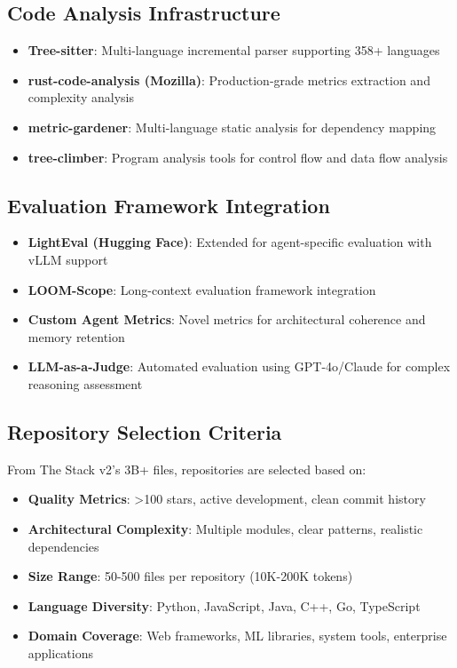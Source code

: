 \documentclass{article}
\begin{document}
\subsection{Code Analysis Infrastructure}
\begin{itemize}
    \item \textbf{Tree-sitter}: Multi-language incremental parser supporting 358+ languages
    \item \textbf{rust-code-analysis (Mozilla)}: Production-grade metrics extraction and complexity analysis
    \item \textbf{metric-gardener}: Multi-language static analysis for dependency mapping
    \item \textbf{tree-climber}: Program analysis tools for control flow and data flow analysis
\end{itemize}

\subsection{Evaluation Framework Integration}
\begin{itemize}
    \item \textbf{LightEval (Hugging Face)}: Extended for agent-specific evaluation with vLLM support
    \item \textbf{LOOM-Scope}: Long-context evaluation framework integration
    \item \textbf{Custom Agent Metrics}: Novel metrics for architectural coherence and memory retention
    \item \textbf{LLM-as-a-Judge}: Automated evaluation using GPT-4o/Claude for complex reasoning assessment
\end{itemize}

\subsection{Repository Selection Criteria}
From The Stack v2's 3B+ files, repositories are selected based on:
\begin{itemize}
    \item \textbf{Quality Metrics}: >100 stars, active development, clean commit history
    \item \textbf{Architectural Complexity}: Multiple modules, clear patterns, realistic dependencies
    \item \textbf{Size Range}: 50-500 files per repository (10K-200K tokens)
    \item \textbf{Language Diversity}: Python, JavaScript, Java, C++, Go, TypeScript
    \item \textbf{Domain Coverage}: Web frameworks, ML libraries, system tools, enterprise applications
\end{itemize}
\end{document}
